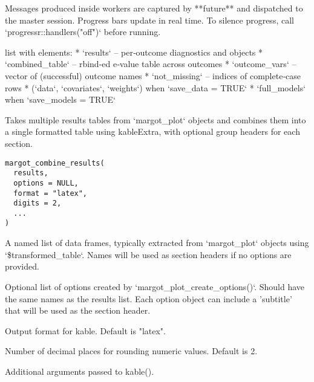 \documentclass[a4paper]{book}
\begin{document}
%
\begin{Details}
Messages produced inside workers are captured by **future** and
dispatched to the master session.  Progress bars update in real time.  To
silence progress, call `progressr::handlers("off")` before running.
\end{Details}
%
\begin{Value}
list with elements:
* `results`         – per‑outcome diagnostics and objects
* `combined\_table`  – rbind‑ed e‑value table across outcomes
* `outcome\_vars`    – vector of (successful) outcome names
* `not\_missing`     – indices of complete‑case rows
* (`data`, `covariates`, `weights`) when `save\_data = TRUE`
* `full\_models` when `save\_models = TRUE`
\end{Value}
%
\begin{Description}
Takes multiple results tables from `margot\_plot` objects and combines them into a single
formatted table using kableExtra, with optional group headers for each section.
\end{Description}
%
\begin{Usage}
\begin{verbatim}
margot_combine_results(
  results,
  options = NULL,
  format = "latex",
  digits = 2,
  ...
)
\end{verbatim}
\end{Usage}
%
\begin{Arguments}
\begin{ldescription}
\item[\code{results}] A named list of data frames, typically extracted from `margot\_plot` objects
using `\$transformed\_table`. Names will be used as section headers if no options
are provided.

\item[\code{options}] Optional list of options created by `margot\_plot\_create\_options()`. Should
have the same names as the results list. Each option object can include a 'subtitle'
that will be used as the section header.

\item[\code{format}] Output format for kable. Default is "latex".

\item[\code{digits}] Number of decimal places for rounding numeric values. Default is 2.

\item[\code{...}] Additional arguments passed to kable().
\end{ldescription}
\end{Arguments}
\end{document}
